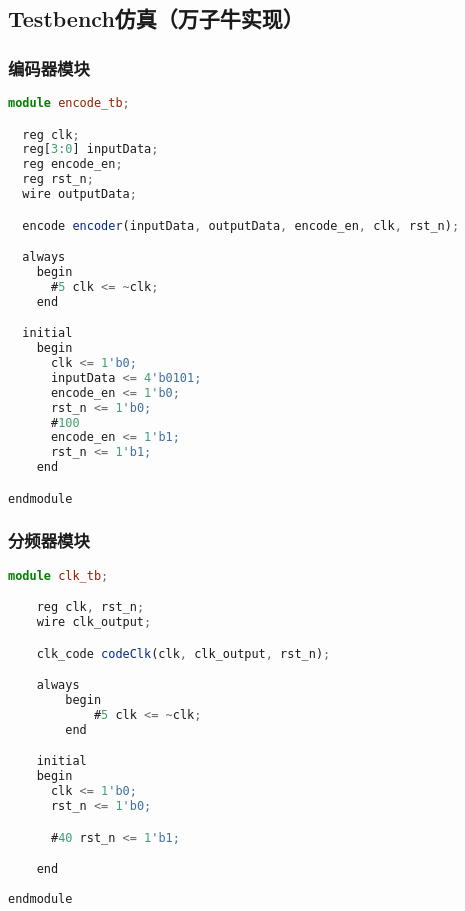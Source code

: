\documentclass{progartcn}
\begin{document}
\subsection{Testbench仿真（万子牛实现）}

\subsubsection{编码器模块}
\begin{lstlisting}[language=TypeScript,caption={encode\_tb.v}]
module encode_tb;

  reg clk;
  reg[3:0] inputData;
  reg encode_en;
  reg rst_n;
  wire outputData;

  encode encoder(inputData, outputData, encode_en, clk, rst_n);

  always
    begin
      #5 clk <= ~clk;
    end

  initial
    begin
      clk <= 1'b0;
      inputData <= 4'b0101;
      encode_en <= 1'b0;
      rst_n <= 1'b0;
      #100
      encode_en <= 1'b1;
      rst_n <= 1'b1;
    end

endmodule
\end{lstlisting}

\subsubsection{分频器模块}
\begin{lstlisting}[language=TypeScript,caption={clk\_tb.v}]
module clk_tb;

    reg clk, rst_n;
    wire clk_output;

    clk_code codeClk(clk, clk_output, rst_n);

    always
        begin
            #5 clk <= ~clk;
        end

    initial
    begin
      clk <= 1'b0;
      rst_n <= 1'b0;

      #40 rst_n <= 1'b1;

    end
        
endmodule
\end{lstlisting}
\end{document}

